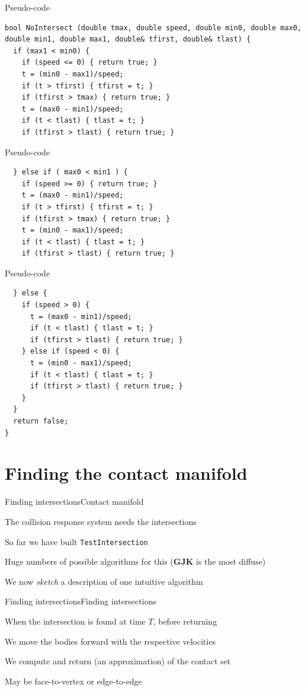 \documentclass{beamer}
\begin{document}
\begin{frame}[fragile]{Pseudo-code}
\begin{lstlisting}
bool NoIntersect (double tmax, double speed, double min0, double max0, double min1, double max1, double& tfirst, double& tlast) { 
  if (max1 < min0) {
    if (speed <= 0) { return true; }
    t = (min0 - max1)/speed; 
    if (t > tfirst) { tfirst = t; } 
    if (tfirst > tmax) { return true; }
    t = (max0 - min1)/speed; 
    if (t < tlast) { tlast = t; } 
    if (tfirst > tlast) { return true; }
\end{lstlisting}
\end{frame}
\begin{frame}[fragile]{Pseudo-code}
\begin{lstlisting}
  } else if ( max0 < min1 ) { 
    if (speed >= 0) { return true; }
    t = (max0 - min1)/speed; 
    if (t > tfirst) { tfirst = t; } 
    if (tfirst > tmax) { return true; }
    t = (min0 - max1)/speed; 
    if (t < tlast) { tlast = t; } 
    if (tfirst > tlast) { return true; }
\end{lstlisting}
\end{frame}
\begin{frame}[fragile]{Pseudo-code}
\begin{lstlisting}
  } else {
    if (speed > 0) { 
      t = (max0 - min1)/speed;
      if (t < tlast) { tlast = t; } 
      if (tfirst > tlast) { return true; }
    } else if (speed < 0) { 
      t = (min0 - max1)/speed; 
      if (t < tlast) { tlast = t; } 
      if (tfirst > tlast) { return true; } 
    }
  } 
  return false;
}
\end{lstlisting}
\end{frame}

\section{Finding the contact manifold}
\begin{slide}{Finding intersections}{Contact manifold}{
\item The collision response system needs the intersections
\item So far we have built \texttt{TestIntersection}
\item Huge numbers of possible algorithms for this (\textbf{GJK} is the most diffuse)
\item We now \textit{sketch} a description of one intuitive algorithm
}\end{slide}

\begin{slide}{Finding intersections}{Finding intersections}{
\item When the intersection is found at time $T$, before returning
\item We move the bodies forward with the respective velocities
\item We compute and return (an approximation) of the contact set
\item May be face-to-vertex or edge-to-edge
}\end{slide}
\end{document}
